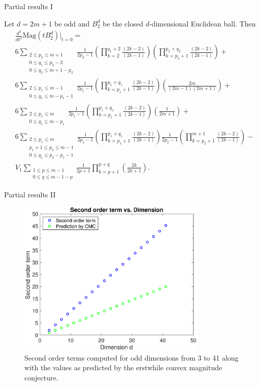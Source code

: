 \documentclass[12pt]{beamer}
\begin{document}
\begin{frame}{Partial results I}

Let $d=2m+1$ be odd and $B_2^d$ be the closed $d$-dimensional Euclidean ball. Then
\scriptsize
\begin{align*}
&\frac{d^2}{dt^2}\text{Mag}(tB_2^d)\big\vert_{t=0} = \\
&6\sum\limits_{\substack{2\leq p_2\leq m+1 \\ 0\leq q_1 \leq p_2-2 \\ 0\leq q_2 \leq m+1-p_2}}\frac{1}{2p_2-1}\left(\prod\limits_{k=2}^{q_1+2}\frac{(2k-2)}{(2k-1)}\right)\left(\prod\limits_{k=p_2+1}^{p_2+q_2}\frac{(2k-2)}{(2k-1)}\right) + \\
&6\sum\limits_{\substack{2\leq p_1\leq m-1 \\ 0\leq q_1\leq m-p_1-1}}\frac{1}{2p_1-1}\left(\prod\limits_{k=p_1+1}^{p_1+q_1}\frac{(2k-2)}{(2k-1)}\right)\left(\frac{2m}{(2m-1)(2m+1)}\right) + \\
&6\sum\limits_{\substack{2\leq p_1\leq m \\ 0\leq q_1\leq m-p_1}}\frac{1}{2p_1-1}\left(\prod\limits_{k=p_1+1}^{p_1+q_1}\frac{(2k-2)}{(2k-1)}\right)\left(\frac{1}{2m+1}\right) + \\
&6\sum\limits_{\substack{2\leq p_1\leq m \\ p_1+1\leq p_2 \leq m-1 \\ 0\leq q_1\leq p_2-p_1-1 }}\frac{1}{2p_1-1}\left(\prod\limits_{k=p_1+1}^{p_1+q_1}\frac{(2k-2)}{(2k-1)}\right)\frac{1}{2p_2-1}\left(\prod\limits_{k=p_2+1}^{m+1}\frac{(2k-2)}{(2k-1)}\right) - \\
&V_{1}\sum\limits_{\substack{1\leq p \leq m-1 \\ 0 \leq q \leq m - 1 - p}}\frac{1}{2p+1}\prod\limits_{k=p+1}^{p+q}\left(\frac{2k}{2k+1}\right).
\end{align*}
\normalsize

\end{frame}

\begin{frame}{Partial results II}
\begin{figure}
\centerline{\includegraphics[width=9cm]{secs.eps}}\caption{\label{fig:secondsplot} Second order terms computed for odd dimensions from 3 to 41 along with the values as predicted by the erstwhile convex magnitude conjecture.}
\end{figure}
\end{frame}
\end{document}
